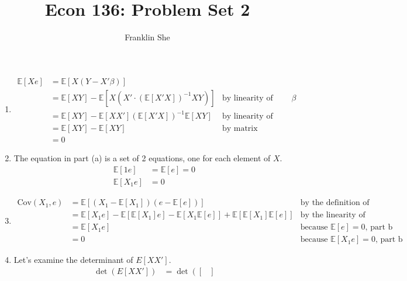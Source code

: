 \documentclass[10pt]{article}
\newcommand{\E}{\mathbb{E}}
\newenvironment{problem}[2][Problem]{\begin{trivlist}
\item[\hskip \labelsep {\bfseries #1}\hskip \labelsep {\bfseries #2.}]}{\end{trivlist}}
\begin{document}
\title{\vspace{-2cm} Econ 136: Problem Set 2}
\author{Franklin She}

\maketitle
 
\begin{problem}{1}
    \hfill
    \begin{enumerate}[label=(\alph*)]
        \item \hfill
            \begin{align*}
                \E[Xe] &= \E[X(Y - X'\beta)] \\
                       &= \E[XY] - \E[X(X' \cdot \left(\E[X'X]\right)^{-1}XY)] & \text{by linearity of expectation and definition of $\beta$} \\   
                       &= \E[XY] - \E[XX']\left(\E[X'X]\right)^{-1}\E[XY] & \text{by linearity of expectation} \\
                       &= \E[XY] - \E[XY] & \text{by matrix properties} \\
                       &= 0
            \end{align*}
        \item
            The equation in part (a) is a set of 2 equations, one for each element of $X$.
            \begin{align*}
                \E[1e] &= \E[e] = 0 \\
                \E[X_1e] &= 0
            \end{align*}
        \item \hfill
            \begin{align*}
                \text{Cov}(X_1, e) &= \E[(X_1 - \E[X_1])(e - \E[e])] & \text{by the definition of covariance} \\
                                   &= \E[X_1e] - \E[\E[X_1]e] - \E[X_1\E[e]] + \E[\E[X_1]\E[e]] & \text{by the linearity of expectations} \\
                                   &= \E[X_1e] & \text{because $\E[e] = 0$, part b} \\
                                   &= 0 & \text{because $\E[X_1e] = 0$, part b}
            \end{align*}
        \item Let's examine the determinant of $E[XX']$.
            \begin{align*}
                \det(E[XX']) 
                &= \det\left(\begin{bmatrix}

\end{bmatrix}
\end{align*}
\end{enumerate}
\end{problem}
\end{document}
